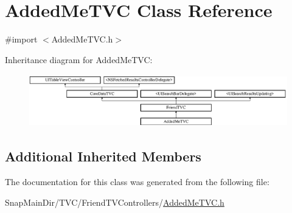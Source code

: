 \hypertarget{interface_added_me_t_v_c}{}\section{Added\+Me\+T\+VC Class Reference}
\label{interface_added_me_t_v_c}


{\ttfamily \#import $<$Added\+Me\+T\+V\+C.\+h$>$}

Inheritance diagram for Added\+Me\+T\+VC\+:\begin{figure}[H]
\begin{center}
\leavevmode
\includegraphics[height=2.304527cm]{interface_added_me_t_v_c}
\end{center}
\end{figure}
\subsection*{Additional Inherited Members}


The documentation for this class was generated from the following file\+:\begin{DoxyCompactItemize}
\item 
Snap\+Main\+Dir/\+T\+V\+C/\+Friend\+T\+V\+Controllers/\hyperlink{_added_me_t_v_c_8h}{Added\+Me\+T\+V\+C.\+h}\end{DoxyCompactItemize}
